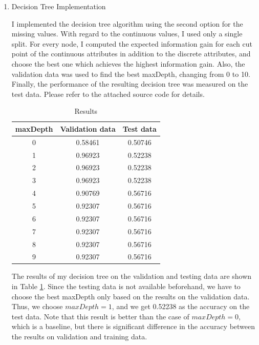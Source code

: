 \begin{enumerate}
\item Decision Tree Implementation

I implemented the decision tree algorithm using the second option for the missing values. With regard to the continuous values, I used only a single split. For every node, I computed the expected information gain for each cut point of the continuous attributes in addition to the discrete attributes, and choose the best one which achieves the highest information gain. Also, the validation data was used to find the best maxDepth, changing from 0 to 10. Finally, the performance of the resulting decision tree was measured on the test data. Please refer to the attached source code for details.

\begin{table}[htb]
\begin{center}
\caption{Results}
\begin{tabular}{|c|c|c|} \hline
maxDepth & Validation data & Test data \\ \hline \hline
0 & 0.58461 & 0.50746 \\ \hline
1 & 0.96923 & 0.52238 \\ \hline
2 & 0.96923 & 0.52238 \\ \hline
3 & 0.96923 & 0.52238 \\ \hline
4 & 0.90769 & 0.56716 \\ \hline
5 & 0.92307 & 0.56716 \\ \hline
6 & 0.92307 & 0.56716 \\ \hline
7 & 0.92307 & 0.56716 \\ \hline
8 & 0.92307 & 0.56716 \\ \hline
9 & 0.92307 & 0.56716 \\ \hline
\end{tabular}
\label{tab:result}
\end{center}
\end{table}

The results of my decision tree on the validation and testing data are shown in Table \ref{tab:result}. Since the testing data is not available beforehand, we have to choose the best maxDepth only based on the results on the validation data. Thus, we choose $maxDepth=1$, and we get 0.52238 as the accuracy on the test data. Note that this result is better than the case of $maxDepth=0$, which is a baseline, but there is significant difference in the accuracy between the results on validation and training data.


\end{enumerate}
